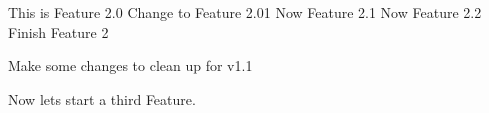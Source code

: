 This is Feature 2.0
Change to Feature 2.01
Now Feature 2.1
Now Feature 2.2
Finish Feature 2

Make some changes to clean up for v1.1

Now lets start a third Feature.
